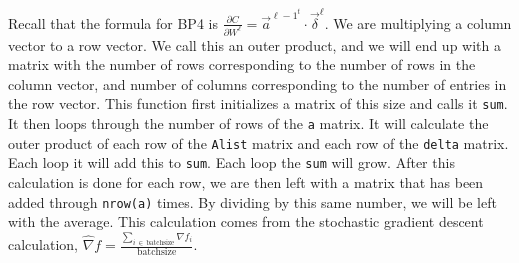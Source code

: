 \documentclass[12pt,letterpaper]{article}
\begin{document}
\begin{enumerate}
Recall that the formula for BP4 is $\frac{\partial C}{\partial W^{\ell}}=\vec{a}^{{\ell-1}^t}\cdot \vec{\delta}^{\ell}$. We are multiplying a column vector to a row vector. We call this an outer product, and we will end up with a matrix with the number of rows corresponding to the number of rows in the column vector, and number of columns corresponding to the number of entries in the row vector. This function first initializes a matrix of this size and calls it \texttt{sum}. It then loops through the number of rows of the \texttt{a} matrix. It will calculate the outer product of each row of the \texttt{Alist} matrix and each row of the \texttt{delta} matrix. Each loop it will add this to \texttt{sum}. Each loop the \texttt{sum} will grow. After this calculation is done for each row, we are then left with a matrix that has been added through \texttt{nrow(a)} times. By dividing by this same number, we will be left with the average. This calculation comes from the stochastic gradient descent calculation, $\hat{\nabla}f=\frac{\sum_{i\,\in\,\text{batchsize}}\nabla f_i}{\text{batchsize}}$.
\end{enumerate}
\end{document}
